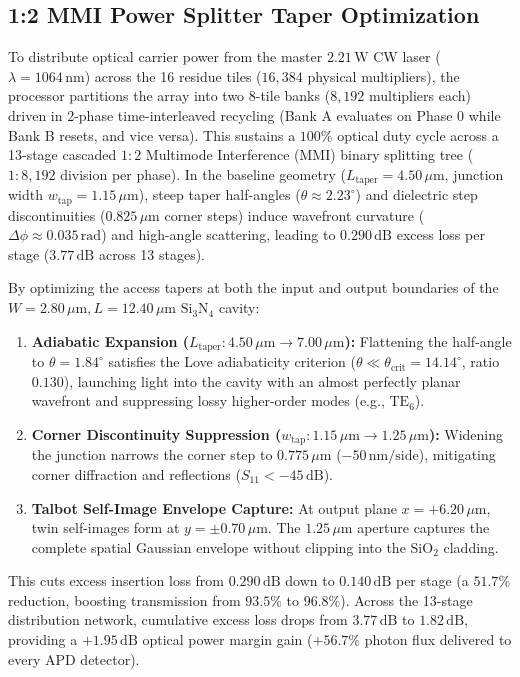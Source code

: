 \documentclass[journal]{IEEEtran}
\begin{document}
\subsection{1:2 MMI Power Splitter Taper Optimization}
To distribute optical carrier power from the master $2.21\,\mathrm{W}$ CW laser ($\lambda = 1064\,\mathrm{nm}$) across the 16 residue tiles ($16,384$ physical multipliers), the processor partitions the array into two 8-tile banks ($8,192$ multipliers each) driven in 2-phase time-interleaved recycling (Bank A evaluates on Phase 0 while Bank B resets, and vice versa). This sustains a $100\%$ optical duty cycle across a 13-stage cascaded $1:2$ Multimode Interference (MMI) binary splitting tree ($1:8,192$ division per phase). In the baseline geometry ($L_{\mathrm{taper}} = 4.50\,\mu\mathrm{m}$, junction width $w_{\mathrm{tap}} = 1.15\,\mu\mathrm{m}$), steep taper half-angles ($\theta \approx 2.23^\circ$) and dielectric step discontinuities ($0.825\,\mu\mathrm{m}$ corner steps) induce wavefront curvature ($\Delta \phi \approx 0.035\,\mathrm{rad}$) and high-angle scattering, leading to $0.290\,\mathrm{dB}$ excess loss per stage ($3.77\,\mathrm{dB}$ across 13 stages).

By optimizing the access tapers at both the input and output boundaries of the $W = 2.80\,\mu\mathrm{m}, L = 12.40\,\mu\mathrm{m}$ $\mathrm{Si_3N_4}$ cavity:
\begin{enumerate}
    \item \textbf{Adiabatic Expansion ($L_{\mathrm{taper}}: 4.50\,\mu\mathrm{m} \to 7.00\,\mu\mathrm{m}$):} Flattening the half-angle to $\theta = 1.84^\circ$ satisfies the Love adiabaticity criterion ($\theta \ll \theta_{\mathrm{crit}} = 14.14^\circ$, ratio $0.130$), launching light into the cavity with an almost perfectly planar wavefront and suppressing lossy higher-order modes (e.g., $\mathrm{TE}_6$).
    \item \textbf{Corner Discontinuity Suppression ($w_{\mathrm{tap}}: 1.15\,\mu\mathrm{m} \to 1.25\,\mu\mathrm{m}$):} Widening the junction narrows the corner step to $0.775\,\mu\mathrm{m}$ ($-50\,\mathrm{nm/side}$), mitigating corner diffraction and reflections ($S_{11} < -45\,\mathrm{dB}$).
    \item \textbf{Talbot Self-Image Envelope Capture:} At output plane $x = +6.20\,\mu\mathrm{m}$, twin self-images form at $y = \pm 0.70\,\mu\mathrm{m}$. The $1.25\,\mu\mathrm{m}$ aperture captures the complete spatial Gaussian envelope without clipping into the $\mathrm{SiO_2}$ cladding.
\end{enumerate}
This cuts excess insertion loss from $0.290\,\mathrm{dB}$ down to $\mathbf{0.140\,\mathrm{dB}}$ per stage (a $51.7\%$ reduction, boosting transmission from $93.5\%$ to $96.8\%$). Across the 13-stage distribution network, cumulative excess loss drops from $3.77\,\mathrm{dB}$ to $\mathbf{1.82\,\mathrm{dB}}$, providing a $\mathbf{+1.95\,\mathrm{dB}}$ optical power margin gain ($+56.7\%$ photon flux delivered to every APD detector).
\end{document}
